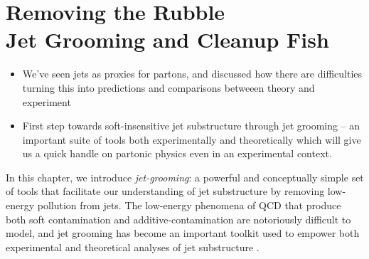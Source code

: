 \chapter[Removing the Rubble:\\\phantom{Chapter 4:|}Jet Grooming and Cleanup Fish]{Removing the Rubble\\Jet Grooming and Cleanup Fish}

\label{chap:grooming}

\vspace{-200pt}


\begin{itemize}
    \item
We've seen jets as proxies for partons, and discussed how there are difficulties turning this into predictions and comparisons betweeen theory and experiment

    \item
First step towards soft-insensitive jet substructure through jet grooming -- an important suite of tools both experimentally and theoretically which will give us a quick handle on partonic physics even in an experimental context.
\end{itemize}


In this chapter, we introduce \textit{\gls{jet-grooming}}:
%
a powerful and conceptually simple set of tools that facilitate our understanding of jet substructure by removing low-energy pollution from jets.
%
The low-energy phenomena of QCD that produce both soft contamination and \gls{additive-contamination} are notoriously difficult to model, and jet grooming has become an important toolkit used to empower both experimental and theoretical analyses of jet substructure
\cite{Krohn:2009th,Ellis:2009me,Larkoski:2014wba,Dasgupta:2013ihk,Dasgupta:2013via,Tseng:2013dva,Dasgupta:2016ktv,Thaler:2008ju,Thaler:2011gf,Hook:2011cq,Gallicchio:2011xq,Soper:2012pb,Gallicchio:2012ez,CMS-PAS-JME-09-001,CMS-PAS-EXO-09-002,CMS:2013kfa,ATL-PHYS-PUB-2009-081,ATL-PHYS-PUB-2010-008,Cui:2010km,ATLAS-CONF-2011-053,Chatrchyan:2013rla,Larkoski:2013eya,Dasgupta:2012hg,Backovic:2013bga,ATLAS-CONF-2013-084,Komiske:2018vkc,Komiske:2016rsd,Metodiev:2018ftz,Krohn:2012fg,MERINO:2013tta,Bhattacherjee:2016bpy,Macaluso:2018tck,Egan:2017ojy,Kasieczka:2017nvn,Pearkes:2017hku,Butter:2017cot,Catani:1992ua,Dokshitzer:1998kz,Dasgupta:2001sh,Banfi:2004yd,Banfi:2005gj,Ellis:2009su,Banfi:2010pa,Walsh:2011fz,Chien:2012ur,Li:2012bw,Jouttenus:2013hs,Hatta:2013iba,Larkoski:2014tva,Procura:2018zpn,Aaboud:2017aca,Frye:2016aiz, Almeida:2008yp,Larkoski:2017iuy,Larkoski:2017cqq,Thaler:2010tr,Abdesselam:2010pt,Katz:2010mr,Gallicchio:2010dq,Adams:2015hiv,Sirunyan:2017ezt,Moore:2018lsr,FerreiradeLima:2016gcz,Rubin:2010fc,Chatrchyan:2012sn,ATLAS:2019kwg,CMS-PAS-BTV-13-001,CMS-PAS-JME-13-006,Kribs:2009yh,Chen:2010wk,Hackstein:2010wk,Kim:2010uj,Almeida:2011aa,Pandolfi:2012ima,Vernieri:2014wfa,CMS-PAS-HIG-17-007,Procura:2014cba,ATL-PHYS-PUB-2019-027,Aad:2019vyi,ATLAS:2020gwe}.



